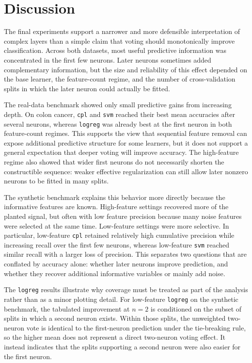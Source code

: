 \section*{Discussion}

The final experiments support a narrower and more defensible interpretation of complex layers than a simple
claim that voting should monotonically improve classification.
Across both datasets, most useful predictive information was concentrated in the first few neurons.
Later neurons sometimes added complementary information, but the size and reliability of this effect depended on
the base learner, the feature-count regime, and the number of cross-validation splits in which the later neuron
could actually be fitted.

The real-data benchmark showed only small predictive gains from increasing depth.
On colon cancer, \texttt{cpl} and \texttt{svm} reached their best mean accuracies after several neurons,
whereas \texttt{logreg} was already best at the first neuron in both feature-count regimes.
This supports the view that sequential feature removal can expose additional predictive structure for some
learners, but it does not support a general expectation that deeper voting will improve accuracy.
The high-feature regime also showed that wider first neurons do not necessarily shorten the constructible
sequence: weaker effective regularization can still allow later nonzero neurons to be fitted in many splits.

The synthetic benchmark explains this behavior more directly because the informative features are known.
High-feature settings recovered more of the planted signal, but often with low feature precision because many
noise features were selected at the same time.
Low-feature settings were more selective.
In particular, low-feature \texttt{cpl} retained relatively high cumulative precision while increasing recall
over the first few neurons, whereas low-feature \texttt{svm} reached similar recall with a larger loss of
precision.
This separates two questions that are conflated by accuracy alone: whether later neurons improve prediction, and
whether they recover additional informative variables or mainly add noise.

The \texttt{logreg} results illustrate why coverage must be treated as part of the analysis rather than as a
minor plotting detail.
For low-feature \texttt{logreg} on the synthetic benchmark, the tabulated improvement at $n=2$ is conditioned on
the subset of splits in which a second neuron exists.
Within those splits, the unweighted two-neuron vote is identical to the first-neuron prediction under the
tie-breaking rule, so the higher mean does not represent a direct two-neuron voting effect.
It instead indicates that the splits supporting a second neuron were also easier for the first neuron.

